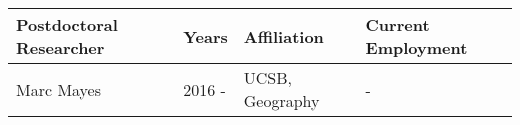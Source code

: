 
\begin{longtable}{lp{1.5cm} p{3.5cm}p{4.5cm}}
Postdoctoral Researcher & Years & Affiliation & Current Employment\\
\hline 
\endhead 
Marc Mayes & 2016 -  & UCSB, Geography &   - \\
\end{longtable}

